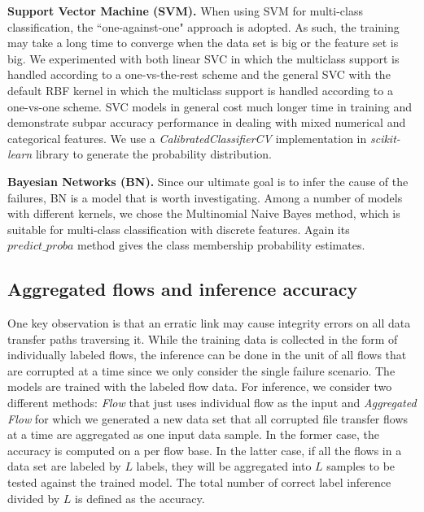 {\bf Support Vector Machine (SVM).} When using SVM for multi-class classification, the ``one-against-one" approach is adopted. As such, the training may take a long time to converge when the data set is big or the feature set is big. We experimented with both linear SVC in which the multiclass support is handled according to a one-vs-the-rest scheme and the general SVC with the default RBF kernel in which the multiclass support is handled according to a one-vs-one scheme.  SVC models in general cost much longer time in training and demonstrate subpar accuracy performance in dealing with mixed numerical and categorical features.  We use a \emph{CalibratedClassifierCV} implementation in {\it scikit-learn} library to generate the probability distribution.

{\bf Bayesian Networks (BN).} Since our ultimate goal is to infer the cause of the failures, BN is a model that is worth investigating. Among a number of models with different kernels, we chose the Multinomial Naive Bayes method, which is suitable for multi-class classification with discrete features. Again its $predict\_proba$ method gives the class membership probability estimates.

\subsection{Aggregated flows and inference accuracy}
One key observation is that an erratic link may cause integrity errors on all data transfer paths traversing it. While the training data is collected in the form of individually labeled flows, the inference can be done in the unit of all flows that are corrupted at a time since we only consider the single failure scenario. The models are trained with the labeled flow data.  For inference, we consider two different methods: {\it Flow} that just uses individual flow as the input and {\it Aggregated Flow} for which we generated a new data set that all corrupted file transfer flows at a time are aggregated as one input data sample. In the former case, the accuracy is computed on a per flow base. In the latter case, if all the flows in a data set are labeled by $L$ labels, they will be aggregated into $L$ samples to be tested against the trained model. The total number of correct label inference divided by $L$ is defined as the accuracy.

